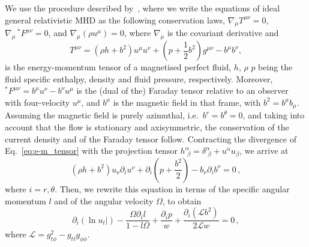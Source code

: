 \documentclass[twocolumn,aps,showpacs,showkeys,prd,superscriptaddress,byrevtex, amsmath]{revtex4-1}
\begin{document}
We use the procedure described by~\cite{Montero:2007}, where we write the equations of ideal general relativistic MHD as the following conservation laws, $\nabla_{\mu} T^{\mu\nu} = 0$, $\nabla_{\mu} \,^\ast F^{\mu\nu} = 0$, and 
$\nabla_{\mu} (\rho u^{\mu}) = 0$, 
where $\nabla_{\mu}$ is the covariant derivative and
\begin{equation}\label{eq:e-m_tensor}
T^{\mu\nu} = (\rho h + b^2)u^{\mu}u^{\nu} + \left(p + \frac{1}{2}b^2\right)g^{\mu\nu} - b^{\mu}b^{\nu},
\end{equation}
is the energy-momentum tensor of a magnetised perfect fluid, $h$, $\rho$ $p$ being the fluid specific enthalpy, density and fluid pressure, respectively. 
Moreover, $^\ast F^{\mu\nu} = b^{\mu}u^{\nu} - b^{\nu}u^{\mu}$ is the (dual of the) Faraday tensor relative to an observer with 
four-velocity $u^{\mu}$, and $b^{\mu}$ is the magnetic field in that frame, with
$b^2=b^{\mu}b_{\mu}$. Assuming the magnetic field is purely azimuthal, i.e.~$b^r = b^{\theta} = 0$,
and taking into account that the flow is stationary and axisymmetric, the conservation of the current density and of the Faraday tensor follow. Contracting the divergence of Eq.~\eqref{eq:e-m_tensor} with the projection tensor $h^{\alpha}_{\,\,\beta} = \delta^{\alpha}_{\,\,\beta} + u^{\alpha}u_{\beta}$, we arrive at
\begin{equation}
(\rho h + b^2)u_{\nu}\partial_i u^{\nu} + \partial_i\left(p + \frac{b^2}{2}\right) - b_{\nu}\partial_i b^{\nu}=0\,,
\end{equation}
where $i = r, \theta$. Then, we rewrite this equation in terms of the specific angular momentum $l$ and of the angular velocity $\Omega$, to obtain
\begin{equation}\label{eq:diff_ver}
\partial_i(\ln u_t|) - \frac{\Omega \partial_i l}{1-l\Omega} + \frac{\partial_i p}{w} + \frac{\partial_i(\mathcal{L}b^2)}{2\mathcal{L}w} = 0\,,
\end{equation}
where $\mathcal{L} = g_{t\phi}^2 - g_{tt}g_{\phi\phi}$.
\end{document}
